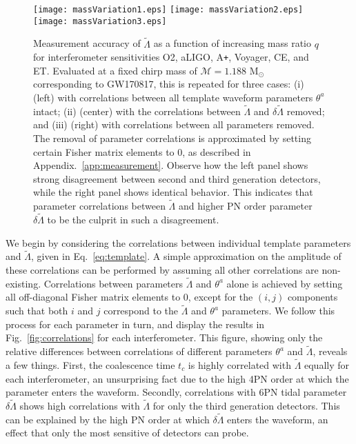 \documentclass[prd,twocolumn,nofootinbib,superscriptaddress,amsmath,amssymb]{revtex4-1}
\begin{document}
\begin{figure*}
\begin{center} 
\texttt{[image: massVariation1.eps]}
\texttt{[image: massVariation2.eps]}
\texttt{[image: massVariation3.eps]}
\end{center}
\caption{
Measurement accuracy of $\tilde\Lambda$ as a function of increasing mass ratio $q$ for interferometer sensitivities O2, aLIGO, A\texttt{+}, Voyager, CE, and ET.
Evaluated at a fixed chirp mass of $\mathcal{M}=1.188\text{ M}_{\odot}$ corresponding to GW170817, this is repeated for three cases: (i) (left) with correlations between all template waveform parameters $\theta^a$ intact; (ii) (center) with the correlations between $\tilde\Lambda$ and $\delta\tilde\Lambda$ removed; and (iii) (right) with correlations between all parameters removed.
The removal of parameter correlations is approximated by setting certain Fisher matrix elements to 0, as described in Appendix.~\ref{app:measurement}.
Observe how the left panel shows strong disagreement between second and third generation detectors, while the right panel shows identical behavior.
This indicates that parameter correlations between $\tilde\Lambda$ and higher PN order parameter $\delta\tilde\Lambda$ to be the culprit in such a disagreement.
}
\label{fig:massVariation}
\end{figure*} 

We begin by considering the correlations between individual template parameters and $\tilde\Lambda$, given in Eq.~\ref{eq:template}.
A simple approximation on the amplitude of these correlations can be performed by assuming all other correlations are non-existing.
Correlations between parameters $\tilde\Lambda$ and $\theta^a$ alone is achieved by setting all off-diagonal Fisher matrix elements to $0$, except for the $(i,j)$ components such that both $i$ and $j$ correspond to the $\tilde\Lambda$ and $\theta^a$ parameters.
We follow this process for each parameter in turn, and display the results in Fig.~\ref{fig:correlations} for each interferometer.
This figure, showing only the relative differences between correlations of different parameters $\theta^a$ and $\tilde\Lambda$, reveals a few things.
First, the coalescence time $t_c$ is highly correlated with $\tilde\Lambda$ equally for each interferometer, an unsurprising fact due to the high 4PN order at which the parameter enters the waveform.
Secondly, correlations with 6PN tidal parameter $\delta\tilde\Lambda$ shows high correlations with $\tilde\Lambda$ for only the third generation detectors.
This can be explained by the high PN order at which $\delta\tilde\Lambda$ enters the waveform, an effect that only the most sensitive of detectors can probe. 
\end{document}
